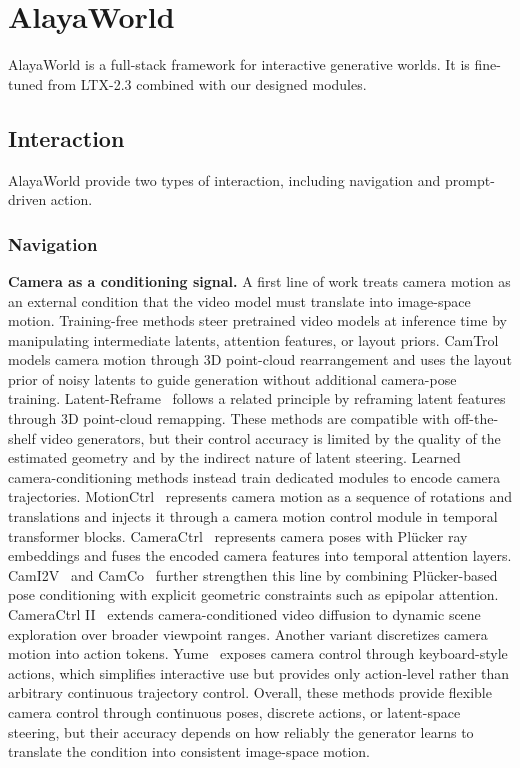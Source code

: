 \section{AlayaWorld}
\label{sec:alayaworld}

AlayaWorld is a full-stack framework for interactive generative worlds. It is fine-tuned from LTX-2.3 combined with our designed modules.

\subsection{Interaction}
\label{subsec:agency}

AlayaWorld provide two types of interaction, including navigation and prompt-driven action.

\subsubsection{Navigation} 
\textbf{Camera as a conditioning signal.}
A first line of work treats camera motion as an external condition that the video model must translate into image-space motion.
Training-free methods steer pretrained video models at inference time by manipulating intermediate latents, attention features, or layout priors.
CamTrol~\cite{hou2024camtrol} models camera motion through 3D point-cloud rearrangement and uses the layout prior of noisy latents to guide generation without additional camera-pose training.
Latent-Reframe~\cite{zhou2025latentreframe} follows a related principle by reframing latent features through 3D point-cloud remapping.
These methods are compatible with off-the-shelf video generators, but their control accuracy is limited by the quality of the estimated geometry and by the indirect nature of latent steering.
Learned camera-conditioning methods instead train dedicated modules to encode camera trajectories.
MotionCtrl~\cite{wang2024motionctrl} represents camera motion as a sequence of rotations and translations and injects it through a camera motion control module in temporal transformer blocks.
CameraCtrl~\cite{he2025cameractrl} represents camera poses with Plücker ray embeddings and fuses the encoded camera features into temporal attention layers.
CamI2V~\cite{zheng2024cami2v} and CamCo~\cite{xu2024camco} further strengthen this line by combining Plücker-based pose conditioning with explicit geometric constraints such as epipolar attention.
CameraCtrl II~\cite{he2025cameractrl2} extends camera-conditioned video diffusion to dynamic scene exploration over broader viewpoint ranges.
Another variant discretizes camera motion into action tokens.
Yume~\cite{mao2025yume} exposes camera control through keyboard-style actions, which simplifies interactive use but provides only action-level rather than arbitrary continuous trajectory control.
Overall, these methods provide flexible camera control through continuous poses, discrete actions, or latent-space steering, but their accuracy depends on how reliably the generator learns to translate the condition into consistent image-space motion.

